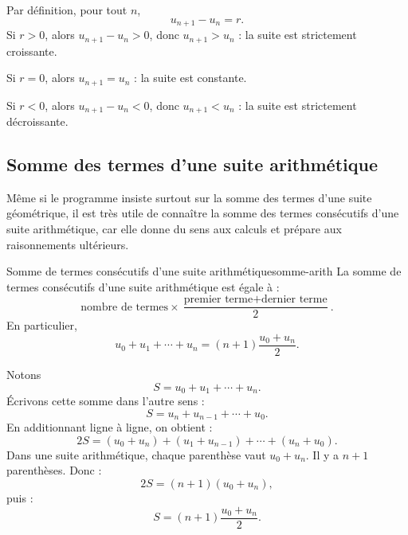 \documentclass[11pt,a4paper]{article}
\begin{document}
\begin{proofbox}
Par définition, pour tout $n$,
\[
 u_{n+1}-u_n=r.
\]
Si $r>0$, alors $u_{n+1}-u_n>0$, donc $u_{n+1}>u_n$ : la suite est strictement croissante.

Si $r=0$, alors $u_{n+1}=u_n$ : la suite est constante.

Si $r<0$, alors $u_{n+1}-u_n<0$, donc $u_{n+1}<u_n$ : la suite est strictement décroissante.
\end{proofbox}

\subsection{Somme des termes d'une suite arithmétique}

Même si le programme insiste surtout sur la somme des termes d'une suite géométrique, il est très utile de connaître la somme des termes consécutifs d'une suite arithmétique, car elle donne du sens aux calculs et prépare aux raisonnements ultérieurs.

\begin{propositionbox}{Somme de termes consécutifs d'une suite arithmétique}{somme-arith}
La somme de termes consécutifs d'une suite arithmétique est égale à :
\[
\text{nombre de termes}\times \frac{\text{premier terme}+\text{dernier terme}}{2}.
\]
En particulier,
\[
 u_0+u_1+\cdots+u_n=(n+1)\frac{u_0+u_n}{2}.
\]
\end{propositionbox}

\begin{proofbox}
Notons
\[
S=u_0+u_1+\cdots+u_n.
\]
Écrivons cette somme dans l'autre sens :
\[
S=u_n+u_{n-1}+\cdots+u_0.
\]
En additionnant ligne à ligne, on obtient :
\[
2S=(u_0+u_n)+(u_1+u_{n-1})+\cdots+(u_n+u_0).
\]
Dans une suite arithmétique, chaque parenthèse vaut $u_0+u_n$. Il y a $n+1$ parenthèses. Donc :
\[
2S=(n+1)(u_0+u_n),
\]
puis :
\[
S=(n+1)\frac{u_0+u_n}{2}.
\]
\end{proofbox}
\end{document}
